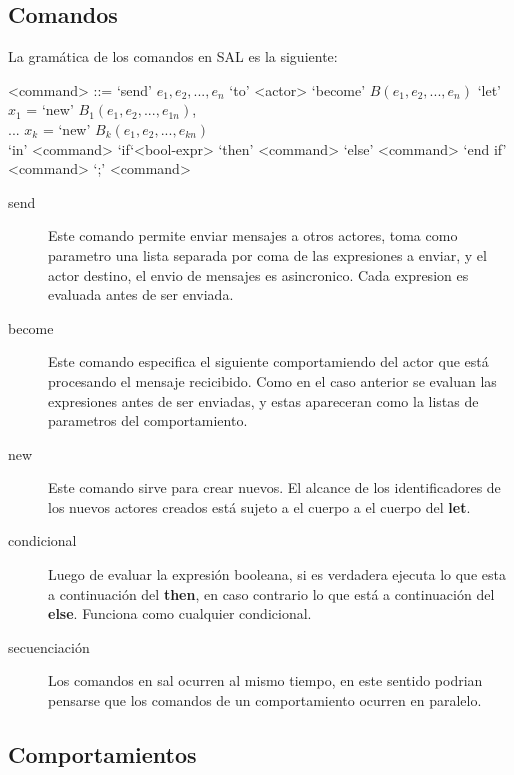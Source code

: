 \documentclass[fleqn]{article}
\begin{document}
\subsection{Comandos}
La gramática de los comandos en SAL es la siguiente:

\begin{grammar}
  <command> ::= `send' $e_1, e_2, ..., e_n$ `to' <actor>  
  \alt `become' $B(e_1, e_2, ..., e_n)$
  \alt `let' $x_1$ = `new' $B_1(e_1, e_2, ..., e_{1n})$, \\
  ... $x_k$ = `new' $B_k(e_1, e_2, ..., e_{kn})$        \\
  `in' <command> 
  \alt `if`<bool-expr> `then' <command> `else' <command> `end if' 
  \alt <command> `;' <command>
\end{grammar}

\begin{description}
\item [send]  Este comando permite enviar mensajes a otros actores, toma como
  parametro una lista separada por coma de las expresiones a enviar, y el actor
  destino, el envio de mensajes es asincronico. Cada expresion es evaluada antes
  de ser enviada.
\item [become] Este comando especifica el siguiente comportamiendo del actor
  que está procesando el mensaje recicibido. Como en el caso anterior se evaluan
  las expresiones antes de ser enviadas, y estas apareceran como la listas de
  parametros del comportamiento. 
\item[new] Este comando sirve para crear nuevos. El alcance de los
  identificadores de los nuevos actores creados está sujeto a el cuerpo a
  el cuerpo del \textbf{let}.
\item[condicional] Luego de evaluar la expresión booleana, si es verdadera
  ejecuta lo que esta a continuación del \textbf{then}, en caso contrario lo que está a
  continuación del \textbf{else}. Funciona como cualquier condicional.
  
\item[secuenciación] Los comandos en sal ocurren al mismo tiempo, en este
  sentido podrian pensarse que los comandos de un comportamiento ocurren en paralelo.
  
\end{description}

\subsection{Comportamientos}
\end{document}

